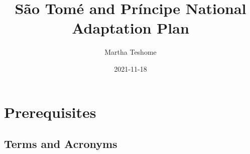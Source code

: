 \documentclass[
]{book}
\title{São Tomé and Príncipe National Adaptation Plan}
\author{Martha Teshome}
\date{2021-11-18}
\begin{document}
\maketitle

{
\setcounter{tocdepth}{1}
\tableofcontents
}
\hypertarget{prerequisites}{%
\chapter*{Prerequisites}\label{prerequisites}}

\hypertarget{terms-and-acronyms}{%
\section*{Terms and Acronyms}\label{terms-and-acronyms}}

\providecommand{\docline}[3]{\noalign{\global\setlength{\arrayrulewidth}{#1}}\arrayrulecolor[HTML]{#2}\cline{#3}}

\setlength{\tabcolsep}{2pt}

\renewcommand*{\arraystretch}{1.5}
\end{document}
